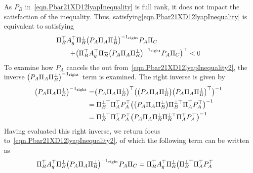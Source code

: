 \begin{proof-dan}
  As $P_{B}$ in\ \eqref{eqn.Pbar21XD12lyapInequality} is full rank, it does not impact the satisfaction of the inequality.
  Thus, satisfying\eqref{eqn.Pbar21XD12lyapInequality} is equivalent to satisfying
  \begin{equation}
    \label{eqn.Pbar21XD12lyapInequality2}
    \begin{split}
      &
      \Pi_{B}^{\top}A_{g}^{\top}\Pi_{B}^{\perp}
      \bigr(P_{A}\Pi_{A}\Pi_{B}^{\perp}\bigr)^{-1_{\text{\rm{right}}}}
      P_{A}\Pi_{C}  \\
      & \qquad
      +
      \bigr(
      \Pi_{B}^{\top}A_{g}^{\top}\Pi_{B}^{\perp}
      \bigr(P_{A}\Pi_{A}\Pi_{B}^{\perp}\bigr)^{-1_{\text{\rm{right}}}}
      P_{A}\Pi_{C}
      \bigr)^{\top}
      <0
    \end{split}
  \end{equation}
  To examine how $P_{A}$ cancels the out from\ \eqref{eqn.Pbar21XD12lyapInequality2}, the inverse $\bigr(P_{A}\Pi_{A}\Pi_{B}^{\perp}\bigr)^{-1_{\text{\rm{right}}}}$ term is examined.
  The right inverse is given by
  \begin{equation*}
    \begin{split}
      \bigr(P_{A}\Pi_{A}\Pi_{B}^{\perp}\bigr)^{-1_{\text{\rm{right}}}}
      &=
      \bigr(P_{A}\Pi_{A}\Pi_{B}^{\perp}\bigr)^{\top}
      \bigr(
      \bigr(P_{A}\Pi_{A}\Pi_{B}^{\perp}\bigr)
      \bigr(P_{A}\Pi_{A}\Pi_{B}^{\perp}\bigr)^{\top}
      \bigr)^{-1} \\
      &=
      \Pi_{B}^{\perp\top}\Pi_{A}^{\top}P_{A}^{\top}
      \bigr(
      \bigr(P_{A}\Pi_{A}\Pi_{B}^{\perp}\bigr)
      \Pi_{B}^{\perp\top}\Pi_{A}^{\top}P_{A}^{\top}
      \bigr)^{-1} \\
      &=
      \Pi_{B}^{\perp\top}\Pi_{A}^{\top}P_{A}^{\top}
      \bigr(
      P_{A}\Pi_{A}\Pi_{B}^{\perp}
      \Pi_{B}^{\perp\top}\Pi_{A}^{\top}P_{A}^{\top}
      \bigr)^{-1} \\
    \end{split}
  \end{equation*}
  Having evaluated this right inverse, we return focus to\ \eqref{eqn.Pbar21XD12lyapInequality2}, of which the following term can be written as
  \begin{equation*}
    \begin{split}
      \Pi_{B}^{\top}A_{g}^{\top}\Pi_{B}^{\perp}\bigr(P_{A}\Pi_{A}\Pi_{B}^{\perp}\bigr)^{-1_{\text{\rm{right}}}}P_{A}\Pi_{C}
      &=
      \Pi_{B}^{\top}A_{g}^{\top}\Pi_{B}^{\perp}
      \bigr(
      \Pi_{B}^{\perp\top}\Pi_{A}^{\top}P_{A}^{\top}

\end{split}
\end{equation*}
\end{proof-dan}
